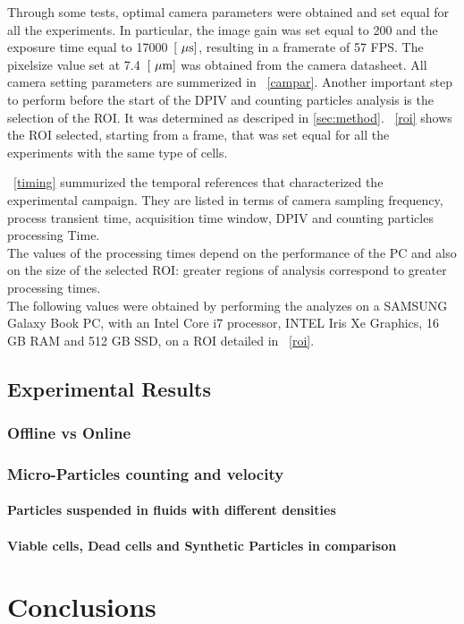 \documentclass[journal]{IEEEtran}
\theoremstyle{definition}
\theoremstyle{remark}
\begin{document}
Through some tests, optimal camera parameters were obtained and set equal for all the experiments. In particular, the image gain was set equal to 200 and the exposure time equal to 17000~$[\rm~\mu s]$, resulting in a framerate of 57 FPS. The pixelsize value set at 7.4~$[\rm~\mu m]$ was obtained from the camera datasheet. All camera setting parameters are summerized in ~\tab\ref{campar}.
Another important step to perform before the start of the DPIV and
counting particles analysis is the selection of the ROI.
It was determined as descriped in \sect\ref{sec:method}. ~\fig\ref{roi} shows the ROI selected, starting from a frame, that was set equal for all the experiments with the same type of cells.


~\tab\ref{timing} summurized the temporal references that characterized the experimental campaign. They are listed in terms of camera sampling frequency, process transient time, acquisition time window, DPIV and counting particles processing Time. 
\\The values of the processing times depend on the performance of the PC and also on the size of the selected ROI: greater regions of analysis correspond to greater processing times.
\\ The following values were obtained by performing the analyzes on a SAMSUNG Galaxy Book PC, with an Intel Core i7 processor, INTEL Iris Xe Graphics, 16 GB RAM and 512 GB SSD, on a ROI detailed in ~\fig\ref{roi}.



\subsection{Experimental Results}

\subsubsection{Offline vs Online}



\subsubsection{Micro-Particles counting and velocity}

\paragraph{Particles suspended in fluids with different densities}

\paragraph{Viable cells, Dead cells and Synthetic Particles in comparison}

\section{Conclusions}



%
\end{document}
